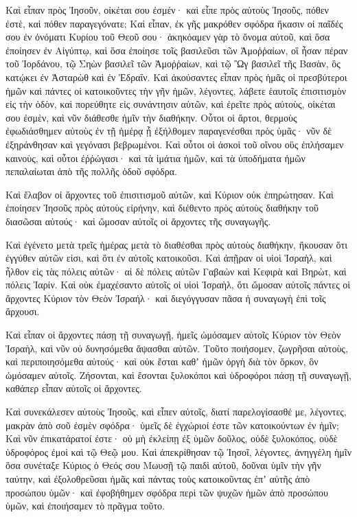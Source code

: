 {Καὶ εἶπαν πρὸς Ἰησοῦν, οἰκέται σου ἐσμέν· καὶ εἶπε πρὸς αὐτοὺς Ἰησοῦς, πόθεν ἐστὲ, καὶ πόθεν παραγεγόνατε;
Καὶ εἶπαν, ἐκ γῆς μακρόθεν σφόδρα ἥκασιν οἱ παῖδές σου ἐν ὀνόματι Κυρίου τοῦ Θεοῦ σου· ἀκηκόαμεν γὰρ τὸ ὄνομα αὐτοῦ, καὶ ὅσα ἐποίησεν ἐν Αἰγύπτῳ,
καὶ ὅσα ἐποίησε τοῖς βασιλεῦσι τῶν Ἀμοῤῥαίων, οἳ ἦσαν πέραν τοῦ Ἰορδάνου, τῷ Σηὼν βασιλεῖ τῶν Ἀμοῤῥαίων, καὶ τῷ Ὢγ βασιλεῖ τῆς Βασὰν, ὃς κατῴκει ἐν Ἀσταρὼθ καὶ ἐν Ἐδραΐν.
Καὶ ἀκούσαντες εἶπαν πρὸς ἡμᾶς οἱ πρεσβύτεροι ἡμῶν καὶ πάντες οἱ κατοικοῦντες τὴν γῆν ἡμῶν, λέγοντες, λάβετε ἑαυτοῖς ἐπισιτισμὸν εἰς τὴν ὁδὸν, καὶ πορεύθητε εἰς συνάντησιν αὐτῶν, καὶ ἐρεῖτε πρὸς αὐτοὺς, οἰκέται σου ἐσμὲν, καὶ νῦν διάθεσθε ἡμῖν τὴν διαθήκην.
Οὗτοι οἱ ἄρτοι, θερμοὺς ἐφωδιάσθημεν αὐτοὺς ἐν τῇ ἡμέρᾳ ᾗ ἐξήλθομεν παραγενέσθαι πρὸς ὑμᾶς· νῦν δὲ ἐξηράνθησαν καὶ γεγόνασι βεβρωμένοι.
Καὶ οὗτοι οἱ ἀσκοὶ τοῦ οἴνου οὓς ἐπλήσαμεν καινοὺς, καὶ οὗτοι ἐῤῥώγασι· καὶ τὰ ἱμάτια ἡμῶν, καὶ τὰ ὑποδήματα ἡμῶν πεπαλαίωται ἀπὸ τῆς πολλῆς ὁδοῦ σφόδρα.
\par }{\PP {}Καὶ ἔλαβον οἱ ἄρχοντες τοῦ ἐπισιτισμοῦ αὐτῶν, καὶ Κύριον οὐκ ἐπηρώτησαν.
Καὶ ἐποίησεν Ἰησοῦς πρὸς αὐτοὺς εἰρήνην, καὶ διέθεντο πρὸς αὐτοὺς διαθήκην τοῦ διασῶσαι αὐτούς· καὶ ὤμοσαν αὐτοῖς οἱ ἄρχοντες τῆς συναγωγῆς.
\par }{\PP {}Καὶ ἐγένετο μετὰ τρεῖς ἡμέρας μετὰ τὸ διαθέσθαι πρὸς αὐτοὺς διαθήκην, ἤκουσαν ὅτι ἐγγύθεν αὐτῶν εἰσι, καὶ ὅτι ἐν αὐτοῖς κατοικοῦσι.
Καὶ ἀπῇραν οἱ υἱοὶ Ἰσραὴλ, καὶ ἦλθον εἰς τὰς πόλεις αὐτῶν· αἱ δὲ πόλεις αὐτῶν Γαβαὼν καὶ Κεφιρὰ καὶ Βηρὼτ, καὶ πόλεις Ἰαρίν.
Καὶ οὐκ ἐμαχέσαντο αὐτοῖς οἱ υἱοὶ Ἰσραὴλ, ὅτι ὤμοσαν αὐτοῖς πάντες οἱ ἄρχοντες Κύριον τὸν Θεὸν Ἰσραήλ· καὶ διεγόγγυσαν πᾶσα ἡ συναγωγὴ ἐπὶ τοῖς ἄρχουσι.
\par }{\PP {}Καὶ εἶπαν οἱ ἄρχοντες πάσῃ τῇ συναγωγῇ, ἡμεῖς ὠμόσαμεν αὐτοῖς Κύριον τὸν Θεὸν Ἰσραὴλ, καὶ νῦν οὐ δυνησόμεθα ἅψασθαι αὐτῶν.
Τοῦτο ποιήσομεν, ζωγρῆσαι αὐτοὺς, καὶ περιποιησόμεθα αὐτούς· καὶ οὐκ ἔσται καθʼ ἡμῶν ὀργὴ διὰ τὸν ὅρκον, ὃν ὠμόσαμεν αὐτοῖς.
Ζήσονται, καὶ ἔσονται ξυλοκόποι καὶ ὑδροφόροι πάσῃ τῇ συναγωγῇ, καθάπερ εἶπαν αὐτοῖς οἱ ἄρχοντες.
\par }{\PP {}Καὶ συνεκάλεσεν αὐτοὺς Ἰησοῦς, καὶ εἶπεν αὐτοῖς, διατί παρελογίσασθέ με, λέγοντες, μακρὰν ἀπὸ σοῦ ἐσμὲν σφόδρα· ὑμεῖς δὲ ἐγχώριοί ἐστε τῶν κατοικούντων ἐν ἡμῖν;
Καὶ νῦν ἐπικατάρατοί ἐστε· οὐ μὴ ἐκλείπῃ ἐξ ὑμῶν δοῦλος, οὐδὲ ξυλοκόπος, οὐδὲ ὑδροφόρος ἐμοὶ καὶ τῷ Θεῷ μου.
Καὶ ἀπεκρίθησαν τῷ Ἰησοῖ, λέγοντες, ἀνηγγέλη ἡμῖν ὅσα συνέταξε Κύριος ὁ Θεός σου Μωυσῇ τῷ παιδὶ αὐτοῦ, δοῦναι ὑμῖν τὴν γῆν ταύτην, καὶ ἐξολοθρεῦσαι ἡμᾶς καὶ πάντας τοὺς κατοικοῦντας ἐπʼ αὐτῆς ἀπὸ προσώπου ὑμῶν· καὶ ἐφοβήθημεν σφόδρα περὶ τῶν ψυχῶν ἡμῶν ἀπὸ προσώπου ὑμῶν, καὶ ἐποιήσαμεν τὸ πρᾶγμα τοῦτο.
}
